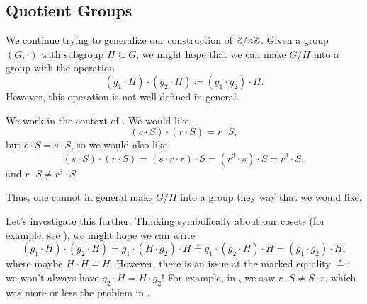\documentclass[../notes.tex]{subfiles}
\begin{document}
\subsection{Quotient Groups}
We continue trying to generalize our construction of $\mathbb Z/n\mathbb Z$. Given a group $(G,\cdot)$ with subgroup $H\subseteq G$, we might hope that we can make $G/H$ into a group with the operation
\[(g_1\cdot H)\cdot(g_2\cdot H)\coloneqq(g_1\cdot g_2)\cdot H.\]
However, this operation is not well-defined in general.
\begin{example} \label{ex:bad-quotient}
    We work in the context of . We would like
    \[(e\cdot S)\cdot(r\cdot S)=r\cdot S,\]
    but $e\cdot S=s\cdot S$, so we would also like
    \[(s\cdot S)\cdot(r\cdot S)=(s\cdot r\cdot r)\cdot S=\left(r^3\cdot s\right)\cdot S=r^3\cdot S,\]
    and $r\cdot S\ne r^3\cdot S$.
\end{example}
Thus, one cannot in general make $G/H$ into a group they way that we would like.

Let's investigate this further. Thinking symbolically about our cosets (for example, see ), we might hope we can write
\begin{equation}
    (g_1\cdot H)\cdot(g_2\cdot H)=g_1\cdot(H\cdot g_2)\cdot H\stackrel*=g_1\cdot(g_2\cdot H)\cdot H=(g_1\cdot g_2)\cdot H, \label{eq:pipe-dream-normal-subgroup}
\end{equation}
where maybe $H\cdot H=H$. However, there is an issue at the marked equality $\stackrel*=$: we won't always have $g_2\cdot H=H\cdot g_2$! For example, in , we saw $r\cdot S\ne S\cdot r$, which was more or less the problem in .
\end{document}
